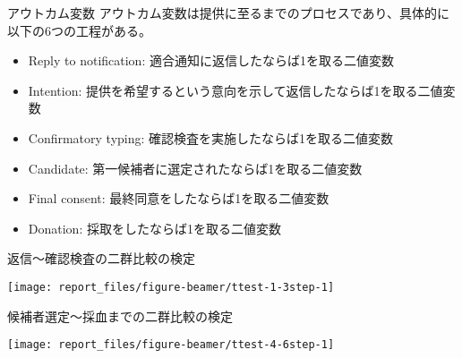 \documentclass[
      aspectratio=169,
        12pt,
    ]{beamer}
\providecommand{\tightlist}{%
  \setlength{\itemsep}{0pt}\setlength{\parskip}{0pt}}
\begin{document}
\begin{frame}{アウトカム変数}
\protect\hypertarget{ux30a2ux30a6ux30c8ux30abux30e0ux5909ux6570}{}
アウトカム変数は提供に至るまでのプロセスであり、具体的に以下の6つの工程がある。

\begin{itemize}
\tightlist
\item
  Reply to notification: 適合通知に返信したならば1を取る二値変数
\item
  Intention: 提供を希望するという意向を示して返信したならば1を取る二値変数
\item
  Confirmatory typing: 確認検査を実施したならば1を取る二値変数
\item
  Candidate: 第一候補者に選定されたならば1を取る二値変数
\item
  Final consent: 最終同意をしたならば1を取る二値変数
\item
  Donation: 採取をしたならば1を取る二値変数
\end{itemize}
\end{frame}

\begin{frame}{返信～確認検査の二群比較の検定}
\protect\hypertarget{ux8fd4ux4fe1ux78baux8a8dux691cux67fbux306eux4e8cux7fa4ux6bd4ux8f03ux306eux691cux5b9a}{}
\begin{center}\texttt{[image: report\_files/figure-beamer/ttest-1-3step-1]} \end{center}
\end{frame}

\begin{frame}{候補者選定～採血までの二群比較の検定}
\protect\hypertarget{ux5019ux88dcux8005ux9078ux5b9aux63a1ux8840ux307eux3067ux306eux4e8cux7fa4ux6bd4ux8f03ux306eux691cux5b9a}{}
\begin{center}\texttt{[image: report\_files/figure-beamer/ttest-4-6step-1]} \end{center}
\end{frame}
\end{document}
